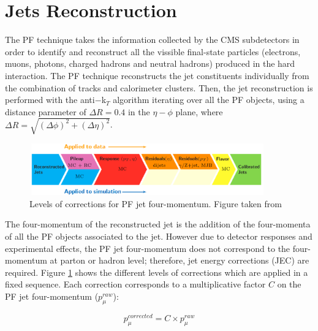 \section{Jets Reconstruction}
\label{sec:Jet}


The PF technique \cite{CMS-PAS-PFT-09-001} takes the information collected by the CMS subdetectors in order to identify and reconstruct
all the vissible final-state particles (electrons, muons, photons, charged hadrons and neutral hadrons) produced
in the hard interaction. The PF technique reconstructs the jet constituents individually from the
combination of tracks and calorimeter clusters. Then, the jet reconstruction is performed
with the anti$-$k$_{T}$ algorithm \cite{AntiKTAlgorithm} iterating over all the PF objects, using a distance parameter of
$\Delta R = 0.4$ in the $\eta-\phi$ plane, where $\Delta R = \sqrt{(\Delta \phi)^2+(\Delta \eta)^2}$.\\

\begin{figure}[ht]%
  \begin{center}
    \includegraphics[width=0.9\textwidth]{figuras/Chapter3/JEC_levels.png}
    \caption{Levels of corrections for PF jet four-momentum. Figure taken from \cite{JESandJER}}
    \label{fig:JEC_levels}
  \end{center}
\end{figure}

The four-momentum of the reconstructed jet is the addition of the four-momenta of all the PF objects associated to the jet. However
due to detector responses and experimental effects, the PF jet four-momentum does not correspond to the four-momentum
at parton or hadron level; therefore, jet energy corrections (JEC) are required. Figure \ref{fig:JEC_levels} shows the different
levels of corrections which are applied in a fixed sequence. Each correction corresponds to a multiplicative factor $C$ on
the PF jet four-momentum ($p_{\mu}^{raw}$):

\begin{equation}
 p_{\mu}^{corrected} = C \times p_{\mu}^{raw}
\end{equation}

